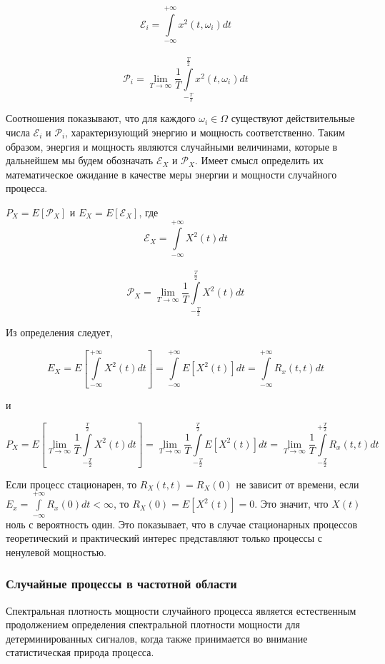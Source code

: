 {\centering 
$$\mathcal{E}_{i} = \int\limits_{-\infty}^{+\infty} x^2(t, \omega_i) dt$$ \\
$$\mathcal{P}_i = \lim\limits_{T\to\infty} \frac{1}{T} \int\limits_{-\frac{T}{2}}^{\frac{T}{2}} x^2(t, \omega_i) dt$$
\par}

Соотношения показывают, что для каждого $\omega_i \in \Omega$ существуют действительные числа 
$\mathcal{E}_i$ и $\mathcal{P}_i$, характеризующий энергию и мощность соответственно. Таким образом, энергия и мощность являются случайными величинами, которые в дальнейшем мы будем обозначать $\mathscr{E}_{X}$ и $\mathscr{P}_{X}$. Имеет смысл определить их математическое ожидание в качестве меры энергии и мощности случайного процесса.

{\centering $P_X = E[\mathscr{P}_X]$ и
$E_X = E[\mathscr{E}_X]$, где \\
$$\mathscr{E}_X = \int\limits_{-\infty}^{+\infty} X^2(t) dt$$ \\
$$\mathscr{P}_X = \lim\limits_{T\to\infty} \frac{1}{T} \int\limits_{-\frac{T}{2}}^{\frac{T}{2}} X^2(t) dt$$
\par}

Из определения следует, 

{\centering
$$E_X = E[\int\limits_{-\infty}^{+\infty} X^2(t) dt] = \int\limits_{-\infty}^{+\infty} E[X^2(t)] dt = \int\limits_{-\infty}^{+\infty} R_x(t, t) dt$$
\par}
{\centering
 и 
}
{\centering
$$P_X = E[\lim\limits_{T\to\infty} \frac{1}{T} \int\limits_{-\frac{T}{2}}^{\frac{T}{2}} X^2(t) dt] = \lim\limits_{T\to\infty} \frac{1}{T} \int\limits_{-\frac{T}{2}}^{\frac{T}{2}} E[X^2(t)] dt = \lim\limits_{T\to\infty} \frac{1}{T} \int\limits_{-\frac{T}{2}}^{+\frac{T}{2}} R_x(t, t) dt$$
\par}   

Если процесс стационарен, то $R_X(t, t) = R_X(0)$ не зависит от времени, если $E_x = \int\limits_{-\infty}^{+\infty} R_x(0) dt < \infty $, то 
$R_X(0) = E[X^2(t)] = 0$. Это значит, что $X(t)$ ноль с вероятность один. Это показывает, что в случае стационарных процессов теоретический и практический интерес представляют только процессы с ненулевой мощностью.

\subsubsection{Случайные процессы в частотной области}
Спектральная плотность мощности случайного процесса является естественным продолжением определения спектральной плотности мощности для детерминированных сигналов, когда также принимается во внимание статистическая природа процесса.

